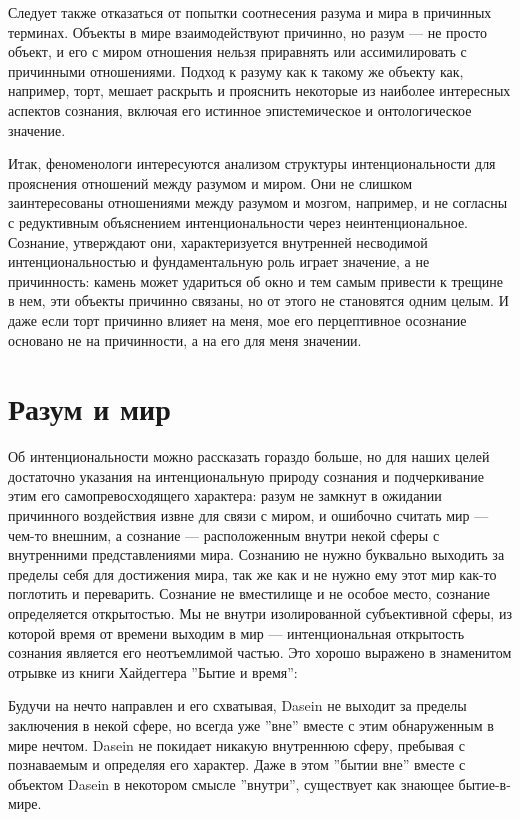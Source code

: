 \documentclass[11pt]{book}
\begin{document}
Следует также отказаться от попытки соотнесения разума и мира в причинных терминах. Объекты в мире взаимодействуют причинно, но разум --- не просто объект, и его с миром отношения нельзя приравнять или ассимилировать с причинными отношениями. Подход к разуму как к такому же объекту как, например, торт, мешает раскрыть и прояснить некоторые из наиболее интересных аспектов сознания, включая его истинное эпистемическое и онтологическое значение.

Итак, феноменологи интересуются анализом структуры интенциональности для прояснения отношений между разумом и миром. Они не слишком заинтересованы отношениями между разумом и мозгом, например, и не согласны с редуктивным объяснением интенциональности через неинтенциональное. Сознание, утверждают они, характеризуется внутренней несводимой интенциональностью и фундаментальную роль играет значение, а не причинность: камень может удариться об окно и тем самым привести к трещине в нем, эти объекты причинно связаны, но от этого не становятся одним целым. И даже если торт причинно влияет на меня, мое его перцептивное осознание основано не на причинности, а на его для меня значении.

\section{Разум и мир}

Об интенциональности можно рассказать гораздо больше, но для наших целей достаточно указания на интенциональную природу сознания и подчеркивание этим его самопревосходящего характера: разум не замкнут в ожидании причинного воздействия извне для связи с миром, и ошибочно считать мир --- чем-то внешним, а сознание --- расположенным внутри некой сферы с внутренними представлениями мира. Сознанию не нужно буквально выходить за пределы себя для достижения мира, так же как и не нужно ему этот мир как-то поглотить и переварить. Сознание не вместилище и не особое место, сознание определяется открытостью. Мы не внутри изолированной субъективной сферы, из которой время от времени выходим в мир --- интенциональная открытость сознания является его неотъемлимой частью. Это хорошо выражено в знаменитом отрывке из книги Хайдеггера ''Бытие и время'':

\smallskip
{}\relax
{}\relax

Будучи на нечто направлен и его схватывая, Dasein не выходит за пределы заключения в некой сфере, но всегда уже ''вне'' вместе с этим обнаруженным в мире нечтом. Dasein не покидает никакую внутреннюю сферу, пребывая с познаваемым и определяя его характер. Даже в этом ''бытии вне'' вместе с объектом Dasein в некотором смысле ''внутри'', существует как знающее бытие-в-мире.
\end{document}
